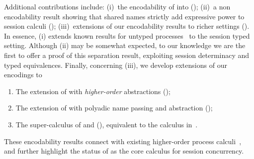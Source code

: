Additional contributions include: (i)~the encodability of \HO into \sessp (); (ii)~a non encodability result showing that shared names strictly add expressive power to session calculi ();
(iii)~extensions of our encodability results to richer settings (). 
In essence, (i) extends known  results for untyped processes~\cite{SangiorgiD:expmpa} to the session typed setting.
Although (ii) may be somewhat expected, to our knowledge we are the first to offer a proof of this separation result, 
exploiting session determinacy and typed equivalences.
Finally, concerning (iii), we develop extensions of our encodings to 
\begin{enumerate}[-]
\item The extension of \HOp with \emph{higher-order} abstractions (\HOpp); 
\item The extension of \HOp with polyadic name passing and abstraction (\pHOp); 
\item The super-calculus of \HOpp and \pHOp (\PHOpp), equivalent to the calculus in~\cite{tlca07}.
\end{enumerate}
These
encodability results connect \HOp with existing higher-order process calculi~\cite{tlca07}, and  
further highlight the status of \HO as the core calculus for session concurrency.



